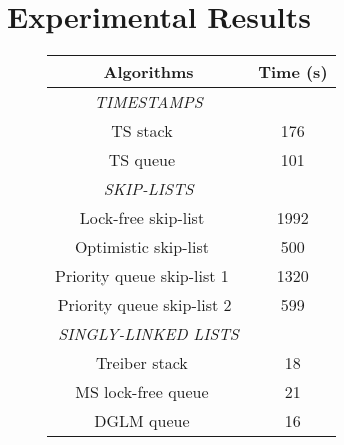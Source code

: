 \section{Experimental Results}
\label{section:experiments}
\newcommand{\emm}{(emm)}
\begin{figure}[]
\center



\begin{tabular}{|c | c | }
  \hline
   \textsf{{\textbf{Algorithms}}} &  \textsf{{\textbf{Time (s)}}} \\
\hline
\textsf{{\textit{TIMESTAMPS}}} & \\
\hline
\textsf{TS stack  ~\cite{MS:QueueAlgorithms}}\;\;\;\;\;\;  & \textsf{176} \\
\textsf{TS queue  ~\cite{MS:QueueAlgorithms}}& \textsf{101} \\
\hline
 \textsf{{\textit{SKIP-LISTS}}} &   \\
\hline
\;\;\;\;\textsf{Lock-free skip-list   ~\cite{ArtOfMpP}}\;\;\;\;\;\;  & \textsf{1992} \\

\textsf{Optimistic skip-list ~\cite{MS:QueueAlgorithms}}& \textsf{500} \\
 
\textsf{Priority queue skip-list 1 ~\cite{Shavit:ElimQueue}}  &  \textsf{1320} \\

\textsf{Priority queue skip-list 2~\cite{Shavit:ElimQueue}}  &  \textsf{599} \\
\hline
   \textsf{{\textit{SINGLY-LINKED LISTS}}} &   \\
\hline
\textsf{Treiber stack  ~\cite{Treiber:stack}}\;\;\;\;\;\; & \textsf {18} \\

\textsf{MS lock-free queue  ~\cite{MS:QueueAlgorithms}}& \textsf{21} \\

\textsf{DGLM queue  ~\cite{Doherty:lockfree}}&  \textsf {16} \\


\end{tabular}
\end{figure}
